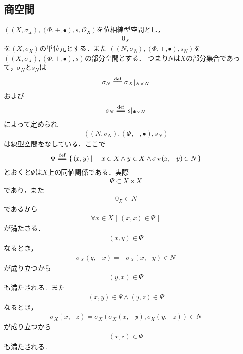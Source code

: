 \subsection{商空間}
	$\left((X,\sigma_X),(\Phi,+,\bullet),s,\mathscr{O}_X\right)$を位相線型空間とし，
	\begin{align}
		0_X
	\end{align}
	を$(X,\sigma_X)$の単位元とする．また
	$\left((N,\sigma_N),(\Phi,+,\bullet),s_N\right)$を$\left((X,\sigma_X),(\Phi,+,\bullet),s\right)$の部分空間とする．
	つまり$N$は$X$の部分集合であって，$\sigma_N$と$s_N$は
	\begin{align}
		\sigma_N \defeq \sigma_X|_{N \times N}
	\end{align}
	および
	\begin{align}
		s_N \defeq s|_{\Phi \times N}
	\end{align}
	によって定められ
	\begin{align}
		\left((N,\sigma_N),(\Phi,+,\bullet),s_N\right)
	\end{align}
	は線型空間をなしている．ここで
	\begin{align}
		\Psi \defeq \Set{(x,y)}{x \in X \wedge y \in X \wedge \sigma_X(x,-y) \in N}
	\end{align}
	とおくと$\Psi$は$X$上の同値関係である．実際
	\begin{align}
		\Psi \subset X \times X
	\end{align}
	であり，また
	\begin{align}
		0_X \in N
	\end{align}
	であるから
	\begin{align}
		\forall x \in X\, \left[\, (x,x) \in \Psi\, \right]
	\end{align}
	が満たさる．
	\begin{align}
		(x,y) \in \Psi
	\end{align}
	なるとき，
	\begin{align}
		\sigma_X(y,-x) = -\sigma_X(x,-y) \in N
	\end{align}
	が成り立つから
	\begin{align}
		(y,x) \in \Psi
	\end{align}
	も満たされる．また
	\begin{align}
		(x,y) \in \Psi \wedge (y,z) \in \Psi
	\end{align}
	なるとき，
	\begin{align}
		\sigma_X(x,-z) = \sigma_X\left(\sigma_X(x,-y),\sigma_X(y,-z)\right) \in N
	\end{align}
	が成り立つから
	\begin{align}
		(x,z) \in \Psi
	\end{align}
	も満たされる．
	
